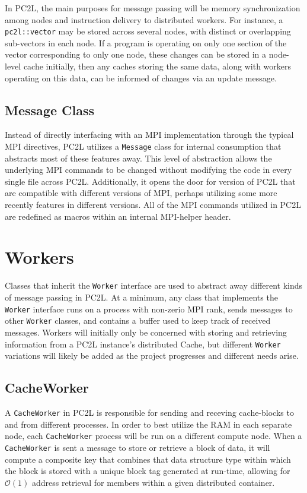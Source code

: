 In PC2L, the main purposes for message passing will be memory synchronization among nodes and instruction delivery to distributed workers. For instance, a \texttt{pc2l::vector} may be stored across several nodes, with distinct or overlapping sub-vectors in each node. If a program is operating on only one section of the vector corresponding to only one node, these changes can be stored in a node-level cache initially, then any caches storing the same data, along with workers operating on this data, can be informed of changes via an update message.  

\subsection{Message Class}
Instead of directly interfacing with an MPI implementation through the typical MPI directives, PC2L utilizes a \texttt{Message} class for internal consumption that abstracts most of these features away. This level of abstraction allows the underlying MPI commands to be changed without modifying the code in every single file across PC2L. Additionally, it opens the door for version of PC2L that are compatible with different versions of MPI, perhaps utilizing some more recently features in different versions. All of the MPI commands utilized in PC2L are redefined as macros within an internal MPI-helper header. 

\section{Workers}
Classes that inherit the \texttt{Worker} interface are used to abstract away different kinds of message passing in PC2L. At a minimum, any class that implements the \texttt{Worker} interface runs on a process with non-zerio MPI rank, sends messages to other \texttt{Worker} classes, and contains a buffer used to keep track of received messages. Workers will initially only be concerned with storing and retrieving information from a PC2L instance's distributed Cache, but different \texttt{Worker} variations will likely be added as the project progresses and different needs arise. 

\subsection{CacheWorker} 
A \texttt{CacheWorker} in PC2L is responsible for sending and receving cache-blocks to and from different processes. In order to best utilize the RAM in each separate node, each \texttt{CacheWorker} process will be run on a different compute node. When a \texttt{CacheWorker} is sent a message to store or retrieve a block of data, it will compute a composite key that combines that data structure type within which the block is stored with a unique block tag generated at run-time, allowing for $\mathcal{O}(1)$ address retrieval for members within a given distributed container. 
